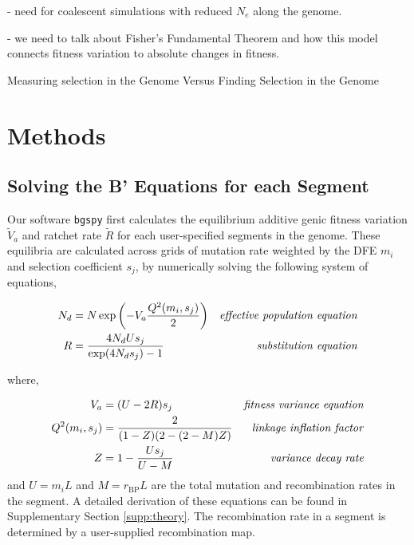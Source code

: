 \documentclass[11pt]{article}
\begin{document}
- need for coalescent simulations with reduced $N_e$ along the genome.

- we need to talk about Fisher's Fundamental Theorem and how this model
connects fitness variation to absolute changes in fitness.

Measuring selection in the Genome Versus Finding Selection in the Genome


\section*{Methods}

\subsection*{Solving the B' Equations for each Segment}
\label{sec:methods-bprime-eqns}

Our software \texttt{bgspy} first calculates the equilibrium additive genic
fitness variation $\widetilde{V}_a$ and ratchet rate $\widetilde{R}$ for each
user-specified segments in the genome. These equilibria are calculated across
grids of mutation rate weighted by the DFE $m_i$ and selection coefficient
$s_j$, by numerically solving the following system of equations,

\begin{align}
  \label{eq:}
  {N}_{d} &= N \exp \left( -V_a \frac{Q^2(m_i, s_j)}{2} \right) & \text{\emph{effective population equation}} \\
  R &= \frac{4N_dU s_j}{\exp(4 N_d s_j)-1}  & \text{\emph{substitution equation}} 
\end{align}

where,

\begin{align}
  V_a &= (U - 2 R) s_j & \text{\emph{fitness variance equation}} \\
  Q^2(m_i, s_j) &= \frac{2}{(1-Z)(2-(2-M)Z)} & \text{\emph{linkage inflation factor}} \\
  Z &= 1 - \frac{Us_j}{U-{M}} & \text{\emph{variance decay rate}}
\end{align}
%
and $U = m_i L$ and $M = r_\text{BP} L$ are the total mutation and
recombination rates in the segment. A detailed derivation of these equations
can be found in Supplementary Section \ref{supp:theory}. The recombination
rate in a segment is determined by a user-supplied recombination map.
\end{document}

